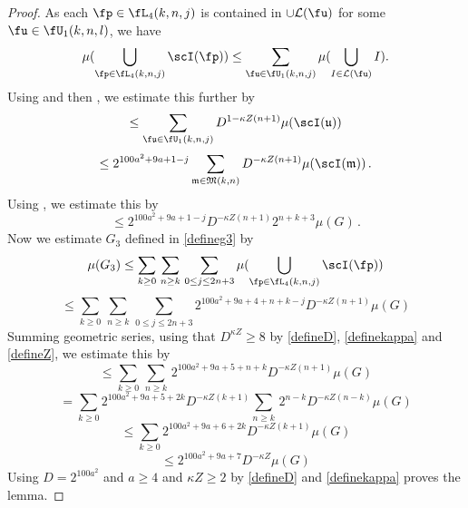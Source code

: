     \begin{proof}
As each $\fp\in \fL_4(k,n,j)$
is contained in $\cup\mathcal{L}(\fu)$ for some
$\fu\in \fU_1(k,n,l)$, we have
\begin{equation}
\mu(\bigcup_{\fp \in \fL_4 (k,n,j)}\scI(\fp))
\le \sum_{\fu\in \fU_1(k,n,j)}
\mu(\bigcup_{I \in \mathcal{L} (\fu)}I).
\end{equation}
Using  and then , we estimate this further
 by
\begin{equation}
    \le \sum_{\fu\in \fU_1(k,n,j)}
    D^{1-\kappa Z(n+1)}
        \mu(\scI(\mathfrak{u}))
\end{equation}
\begin{equation}
    \le 2^{100a^2+9a+1-j} \sum_{\mathfrak{m}\in \mathfrak{M}(k,n)}
     D^{-\kappa Z(n+1)}
    \mu(\scI(\mathfrak{m}))\,.
\end{equation}
Using , we estimate this by
  \begin{equation}
     \le
2^{100a^2 + 9a + 1-j} D^{-\kappa Z(n+1)}
     2^{n+k+3}\mu(G)\, .
\end{equation}
Now we estimate $G_3$ defined in \eqref{defineg3} by
\begin{equation}
    \mu(G_3)\le \sum_{k\ge 0}\, \sum_{n \geq k}\,
    \sum_{0\le j\le 2n+3}
    \mu(\bigcup_{\fp \in \fL_4 (k,n,j)}
    \scI(\fp))
\end{equation}
\begin{equation}
    \le \sum_{k\ge 0}\, \sum_{n \geq k}\,
    \sum_{0\le j\le 2n+3}
    2^{100a^2 + 9a + 4 + n + k -j} D^{-\kappa Z(n+1)}\mu(G)
\end{equation}
Summing geometric series, using that $D^{\kappa Z}\ge 8$ by \eqref{defineD}, \eqref{definekappa} and \eqref{defineZ}, we estimate this by
\begin{equation}
    \le \sum_{k\ge 0}\, \sum_{n \geq k}\,
    2^{100a^2 + 9a + 5 + n + k} D^{-\kappa Z(n+1)}\mu(G)
\end{equation}
\begin{equation}
    = \sum_{k\ge 0} 2^{100a^2 + 9a + 5 + 2k} D^{-\kappa Z(k+1)} \sum_{n \geq k}\,
    2^{n - k} D^{-\kappa Z(n-k)}\mu(G)
\end{equation}
\begin{equation}
    \le \sum_{k\ge 0} 2^{100a^2 + 9a + 6 + 2k} D^{-\kappa Z(k+1)}\mu(G)
\end{equation}
\begin{equation}
   \le 2^{100a^2 + 9a + 7} D^{-\kappa Z}\mu(G)
\end{equation}
Using $D = 2^{100a^2}$ and $a \ge 4$ and $\kappa Z \ge 2$ by \eqref{defineD} and \eqref{definekappa} proves the lemma.
\end{proof}

